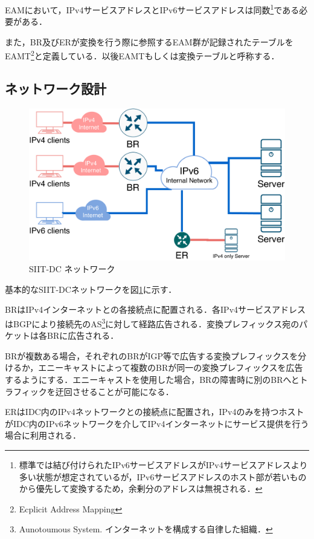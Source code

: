 EAMにおいて，IPv4サービスアドレスとIPv6サービスアドレスは同数\footnote{標準では結び付けられたIPv6サービスアドレスがIPv4サービスアドレスより多い状態が想定されているが，IPv6サービスアドレスのホスト部が若いものから優先して変換するため，余剰分のアドレスは無視される．}である必要がある．

また，BR及びERが変換を行う際に参照するEAM群が記録されたテーブルをEAMT\footnote{Ecplicit Address Mapping}と定義している．以後EAMTもしくは変換テーブルと呼称する．



\subsection{ネットワーク設計}
\label{issue:siit-dc:network}
\begin{figure}[h]
    \begin{center}
      \includegraphics[width=12cm,pagebox=cropbox,clip]{img/siit-dc-network.pdf}
    \end{center}
    \caption{SIIT-DC ネットワーク}
    \label{fig:siit-dc_network}
\end{figure}
基本的なSIIT-DCネットワークを図\ref{fig:siit-dc_network}に示す．

BRはIPv4インターネットとの各接続点に配置される．各IPv4サービスアドレスはBGPにより接続先のAS\footnote{Aunotoumous System. インターネットを構成する自律した組織．}に対して経路広告される．変換プレフィックス宛のパケットは各BRに広告される．

BRが複数ある場合，それぞれのBRがIGP等で広告する変換プレフィックスを分けるか，エニーキャスト\cite{RFC4786}によって複数のBRが同一の変換プレフィックスを広告するようにする．エニーキャストを使用した場合，BRの障害時に別のBRへとトラフィックを迂回させることが可能になる．

ERはIDC内のIPv4ネットワークとの接続点に配置され，IPv4のみを持つホストがIDC内のIPv6ネットワークを介してIPv4インターネットにサービス提供を行う場合に利用される．



